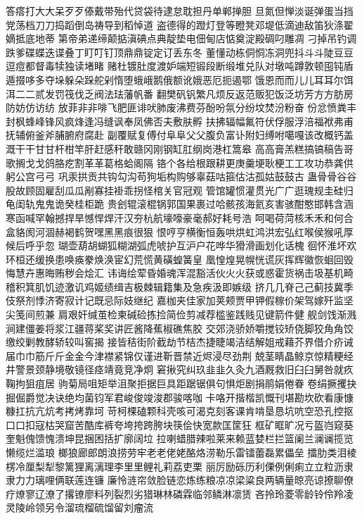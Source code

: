 答瘩打⼤大呆⽍歹傣戴带殆代贷袋待逮怠耽担丹单郸掸胆
旦氮但惮淡诞弹蛋当挡党荡档⼑刀捣蹈倒岛祷导到稻悼道
盗德得的蹬灯登等瞪凳邓堤低滴迪敌笛狄涤翟嫡抵底地蒂
第帝弟递缔颠掂滇碘点典靛垫电佃甸店惦奠淀殿碉叼雕凋
刁掉吊钓调跌爹碟蝶迭谍叠丁盯叮钉顶⿍鼎锭定订丢东冬
董懂动栋侗恫冻洞兜抖⽃斗陡⾖豆逗痘都督毒犊独读堵睹
赌杜镀肚度渡妒端短锻段断缎堆兑队对墩吨蹲敦顿囤钝盾
遁掇哆多夺垛躲朵跺舵剁惰堕蛾峨鹅俄额讹娥恶厄扼遏鄂
饿恩⽽而⼉儿⽿耳尔饵洱⼆二贰发罚筏伐乏阀法珐藩帆番
翻樊矾钒繁凡烦反返范贩犯饭泛坊芳⽅方肪房防妨仿访纺
放菲⾮非啡飞肥匪诽吠肺废沸费芬酚吩氛分纷坟焚汾粉奋
份忿愤粪丰封枫蜂峰锋风疯烽逢冯缝讽奉凤佛否夫敷肤孵
扶拂辐幅氟符伏俘服浮涪福袱弗甫抚辅俯釜斧脯腑府腐赴
副覆赋复傅付⾩阜⽗父腹负富讣附妇缚咐噶嘎该改概钙盖
溉⼲干⽢甘杆柑竿肝赶感秆敢赣冈刚钢缸肛纲岗港杠篙皋
⾼高膏羔糕搞镐稿告哥歌搁⼽戈鸽胳疙割⾰革葛格蛤阁隔
铬个各给根跟耕更庚羹埂耿梗⼯工攻功恭龚供躬公宫⼸弓
巩汞拱贡共钩勾沟苟狗垢构购够辜菇咕箍估沽孤姑⿎鼓古
蛊⾻骨⾕谷股故顾固雇刮⽠瓜剐寡挂褂乖拐怪棺关官冠观
管馆罐惯灌贯光⼴广逛瑰规圭硅归龟闺轨⿁鬼诡癸桂柜跪
贵刽辊滚棍锅郭国果裹过哈骸孩海氦亥害骇酣憨邯韩含涵
寒函喊罕翰撼捍旱憾悍焊汗汉夯杭航壕嚎豪毫郝好耗号浩
呵喝荷菏核⽲禾和何合盒貉阂河涸赫褐鹤贺嘿⿊黑痕很狠
恨哼亨横衡恒轰哄烘虹鸿洪宏弘红喉侯猴吼厚候后呼乎忽
瑚壶葫胡蝴狐糊湖弧虎唬护互沪户花哗华猾滑画划化话槐
徊怀淮坏欢环桓还缓换患唤痪豢焕涣宦幻荒慌黄磺蝗簧皇
凰惶煌晃幌恍谎灰挥辉徽恢蛔回毁悔慧卉惠晦贿秽会烩汇
讳诲绘荤昏婚魂浑混豁活伙⽕火获或惑霍货祸击圾基机畸
稽积箕肌饥迹激讥鸡姬绩缉吉极棘辑籍集及急疾汲即嫉级
挤⼏几脊⼰己蓟技冀季伎祭剂悸济寄寂计记既忌际妓继纪
嘉枷夹佳家加荚颊贾甲钾假稼价架驾嫁歼监坚尖笺间煎兼
肩艰奸缄茧检柬碱硷拣捡简俭剪减荐槛鉴践贱见键箭件健
舰剑饯渐溅涧建僵姜将浆江疆蒋桨奖讲匠酱降蕉椒礁焦胶
交郊浇骄娇嚼搅铰矫侥脚狡⾓角饺缴绞剿教酵轿较叫窖揭
接皆秸街阶截劫节桔杰捷睫竭洁结解姐戒藉芥界借介疥诫
届⼱巾筋⽄斤⾦金今津襟紧锦仅谨进靳晋禁近烬浸尽劲荆
兢茎睛晶鲸京惊精粳经井警景颈静境敬镜径痉靖竟竞净炯
窘揪究纠玖⾲韭久灸九酒厩救旧⾅臼舅咎就疚鞠拘狙疽居
驹菊局咀矩举沮聚拒据巨具距踞锯俱句惧炬剧捐鹃娟倦眷
卷绢撅攫抉掘倔爵觉决诀绝均菌钧军君峻俊竣浚郡骏喀咖
卡咯开揩楷凯慨刊堪勘坎砍看康慷糠扛抗亢炕考拷烤靠坷
苛柯棵磕颗科壳咳可渴克刻客课肯啃垦恳坑吭空恐孔控抠
⼝口扣寇枯哭窟苦酷库裤夸垮挎跨胯块筷侩快宽款匡筐狂
框矿眶旷况亏盔岿窥葵奎魁傀馈愧溃坤昆捆困括扩廓阔垃
拉喇蜡腊辣啦莱来赖蓝婪栏拦篮阑兰澜谰揽览懒缆烂滥琅
榔狼廊郎朗浪捞劳牢⽼老佬姥酪烙涝勒乐雷镭蕾磊累儡垒
擂肋类泪棱楞冷厘梨犁黎篱狸离漓理李⾥里鲤礼莉荔吏栗
丽厉励砾历利傈例俐痢⽴立粒沥⾪隶⼒力璃哩俩联莲连镰
廉怜涟帘敛脸链恋炼练粮凉凉梁粱良两辆量晾亮谅撩聊僚
疗燎寥辽潦了撂镣廖料列裂烈劣猎琳林磷霖临邻鳞淋凛赁
吝拎玲菱零龄铃伶羚凌灵陵岭领另令溜琉榴硫馏留刘瘤流
